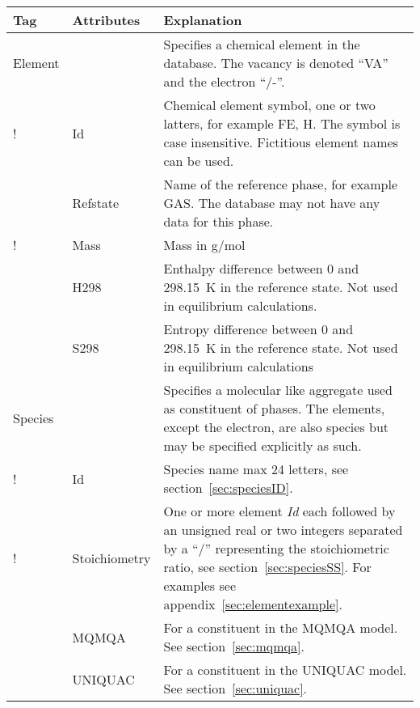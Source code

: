 \documentclass{article}
\begin{document}
\begin{tabular}{|p{} p{} p{}|}\hline
  Tag & Attributes & Explanation\\\hline

  Element & & Specifies a chemical element in the database.  The vacancy is denoted ``VA'' and the electron ``/-''.\\
!          & Id        &  Chemical element symbol, one or two latters, 
                         for example FE, H.  The symbol is case insensitive.
                         Fictitious element names can be used. \\
          & Refstate  &  Name of the reference  phase, for example GAS.  The
                         database may not have any data for this phase. \\
!          & Mass      &  Mass in g/mol\\
          & H298      &  Enthalpy difference between 0 and 298.15~K 
                         in the reference state.  Not used in equilibrium
                         calculations. \\
          & S298      &  Entropy difference between 0 and 298.15~K in 
                         the reference state.  Not used in equilibrium
                         calculations\\\hline

  Species & & Specifies a molecular like aggregate used as constituent of phases.  The elements, except the electron, are also species but may be specified explicitly as such.\\
!          & Id        & Species name max 24 letters, see 
                        section~\ref{sec:speciesID}.\\
!          & Stoichiometry & One or more element {\em Id} each followed by 
                        an unsigned real or two integers separated by a ``/'' 
                        representing the stoichiometric ratio,
                        see section~\ref{sec:speciesSS}.  For examples see
                        appendix~\ref{sec:elementexample}.\\
          & MQMQA     & For a constituent in the MQMQA model.  See 
                        section~\ref{sec:mqmqa}.\\
          & UNIQUAC   & For a constituent in the UNIQUAC model. See 
                        section~\ref{sec:uniquac}.\\\hline

\end{tabular}
\end{document}

